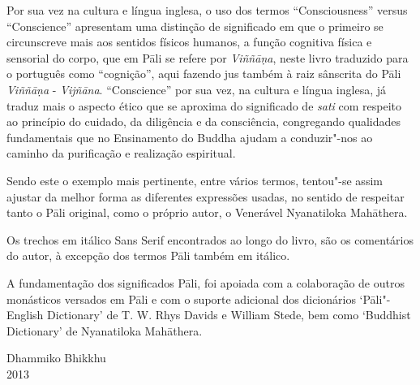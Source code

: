 Por sua vez na cultura e língua inglesa, o uso dos termos “Consciousness” versus “Conscience”
apresentam uma distinção de significado em que o primeiro se circunscreve mais aos sentidos 
físicos humanos, a função cognitiva física e sensorial do corpo, que em Pāli se refere por
\emph{Viññāṇa}, neste livro traduzido para o português como “cognição”, 
aqui fazendo jus também à raiz sânscrita do Pāli \emph{Viññāṇa} - \emph{Vijñāna}.
“Conscience” por sua vez, na cultura e língua inglesa, já traduz mais o aspecto
ético que se aproxima do significado de \emph{sati} com respeito ao princípio do
cuidado, da diligência e da consciência, congregando qualidades fundamentais que no 
Ensinamento do Buddha ajudam a conduzir"-nos ao caminho da purificação e realização espiritual.

Sendo este o exemplo mais pertinente, entre vários termos, tentou"-se assim ajustar da melhor
forma as diferentes expressões usadas, no sentido de respeitar tanto o Pāli
original, como o próprio autor, o Venerável Nyanatiloka Mahāthera.

Os trechos em itálico Sans Serif encontrados ao longo do livro, são os comentários
do autor, à excepção dos termos Pāli também em itálico.

A fundamentação dos significados Pāli, foi apoiada com a colaboração de outros
monásticos versados em Pāli e com o suporte adicional dos dicionários
‘Pāli"-English Dictionary’ de T. W. Rhys Davids e William Stede, bem como
‘Buddhist Dictionary’ de Nyanatiloka Mahāthera.

\bigskip

{\raggedleft
  Dhammiko Bhikkhu\\
  2013
\par}
